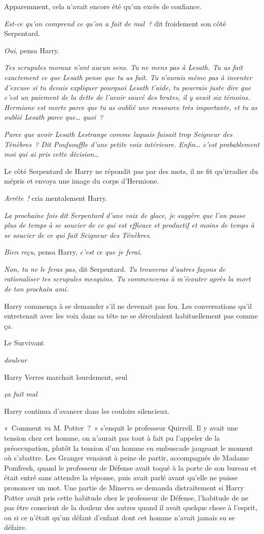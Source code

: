 Apparemment, cela n'avait encore été qu'un excès de confiance.

\emph{Est-ce qu'on comprend ce qu'on a fait de mal~?} dit froidement son côté Serpentard.

\emph{Oui}, pensa Harry.

\emph{Tes scrupules moraux n'ont aucun sens. Tu ne mens pas à Lesath. Tu as fait exactement ce que Lesath pense que tu as fait. Tu n'aurais même pas à inventer d'excuse si tu devais expliquer pourquoi Lesath t'aide, tu pourrais juste dire que c'est un paiement de la dette de l'avoir sauvé des brutes, il y avait six témoins. Hermione est morte parce que tu as oublié une ressource très importante, et tu as oublié Lesath parce que… quoi~?}

\emph{Parce que avoir Lesath Lestrange comme laquais faisait trop Seigneur des Ténèbres~? Dit Poufsouffle d'une petite voix intérieure. Enfin… c'est probablement moi qui ai pris cette décision…}

Le côté Serpentard de Harry ne répondit pas par des mots, il ne fit qu'irradier du mépris et envoya une image du corps d'Hermione.

\emph{Arrête~!} cria mentalement Harry.

\emph{La prochaine fois dit Serpentard d'une voix de glace, je suggère que l'on passe plus de temps à se soucier de ce qui est efficace et productif et moins de temps à se soucier de ce qui fait Seigneur des Ténèbres.}

\emph{Bien reçu}, pensa Harry, \emph{c'est ce que je ferai}.

\emph{Non, tu ne le feras pas}, dit Serpentard. \emph{Tu trouveras d'autres façons de rationaliser tes scrupules mesquins. Tu commenceras à m'écouter après la mort de ton prochain ami.}

Harry commença à se demander s'il ne devenait pas fou. Les conversations qu'il entretenait avec les voix dans sa tête ne se déroulaient habituellement pas comme ça.

Le Survivant

\emph{douleur}

Harry Verres marchait lourdement, seul

\emph{ça fait mal}

Harry continua d'avancer dans les couloirs silencieux.

\later

«~Comment va M. Potter~?~» s'enquit le professeur Quirrell. Il y avait une tension chez cet homme, on n'aurait pas tout à fait pu l'appeler de la préoccupation, plutôt la tension d'un homme en embuscade jaugeant le moment où s'abattre. Les Granger venaient à peine de partir, accompagnés de Madame Pomfresh, quand le professeur de Défense avait toqué à la porte de son bureau et était entré sans attendre la réponse, puis avait parlé avant qu'elle ne puisse prononcer un mot. Une partie de Minerva se demanda distraitement si Harry Potter avait pris cette habitude chez le professeur de Défense, l'habitude de ne pas être conscient de la douleur des autres quand il avait quelque chose à l'esprit, ou si ce n'était qu'un défaut d'enfant dont cet homme n'avait jamais su se défaire.

